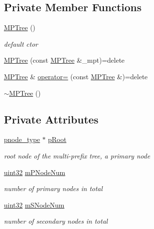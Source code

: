 \subsection*{Private Member Functions}
\begin{DoxyCompactItemize}
\item 
\hyperlink{classMPTree_afe32c972435e628fb95e868304838992}{M\-P\-Tree} ()
\begin{DoxyCompactList}\small\item\em default ctor \end{DoxyCompactList}\item 
\hyperlink{classMPTree_afbd52e698d4f71e1e0384eaa94f7fda4}{M\-P\-Tree} (const \hyperlink{classMPTree}{M\-P\-Tree} \&\-\_\-mpt)=delete
\item 
\hyperlink{classMPTree}{M\-P\-Tree} \& \hyperlink{classMPTree_aea9c3ae2f9a98e4d2fb863c811dc4cd0}{operator=} (const \hyperlink{classMPTree}{M\-P\-Tree} \&)=delete
\item 
\hyperlink{classMPTree_a7a82f874b7a32521498717f701997db5}{$\sim$\-M\-P\-Tree} ()
\end{DoxyCompactItemize}
\subsection*{Private Attributes}
\begin{DoxyCompactItemize}
\item 
\hyperlink{classMPTree_aaccc544aa2a8703f51ca45951f37a279}{pnode\-\_\-type} $\ast$ \hyperlink{classMPTree_a63dc440043e3e752fadf7a6c86f5a66f}{p\-Root}
\begin{DoxyCompactList}\small\item\em root node of the multi-\/prefix tree, a primary node \end{DoxyCompactList}\item 
\hyperlink{types_8h_abd01e8e67e3d94cab04ecaaf4f85ac1b}{uint32} \hyperlink{classMPTree_a7df7e5c59c99de5b95292a27d84f1571}{m\-P\-Node\-Num}
\begin{DoxyCompactList}\small\item\em number of primary nodes in total \end{DoxyCompactList}\item 
\hyperlink{types_8h_abd01e8e67e3d94cab04ecaaf4f85ac1b}{uint32} \hyperlink{classMPTree_a69977970b2e2ae088e5973847071005b}{m\-S\-Node\-Num}
\begin{DoxyCompactList}\small\item\em number of secondary nodes in total \end{DoxyCompactList}\end{DoxyCompactItemize}
